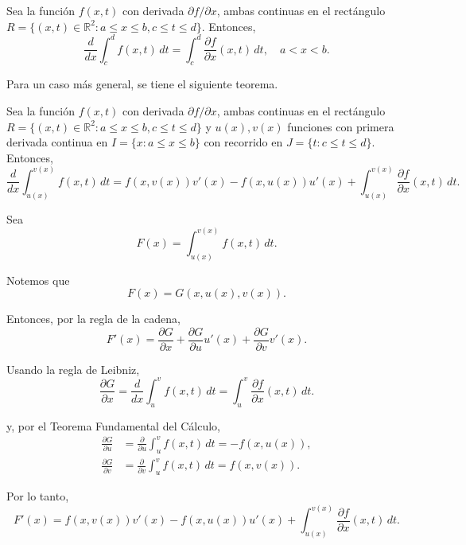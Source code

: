 \begin{teorema}
    Sea la función $f(x,t)$ con derivada $\partial f/\partial x$, ambas continuas en el rectángulo $R = \{(x,t) \in \mathbb{R}^2 : a \leq x \leq b, c \leq t \leq d\}$. Entonces, 
    $$\frac{d}{dx} \int_c^d f(x,t) \,dt = \int_c^d \frac{\partial f}{\partial x}(x,t) \,dt, \quad a < x < b.$$
\end{teorema}

Para un caso más general, se tiene el siguiente teorema.

\begin{teorema}
    Sea la función $f(x,t)$ con derivada $\partial f/\partial x$, ambas continuas en el rectángulo $R = \{(x,t) \in \mathbb{R}^2 : a \leq x \leq b, c \leq t \leq d\}$ y $u(x), v(x)$ funciones con primera derivada continua en $I = \{x : a \leq x\leq b\}$ con recorrido en $J = \{t: c \leq t \leq d\}$. Entonces, 
    $$\frac{d}{dx} \int_{u(x)}^{v(x)} f(x,t) \,dt = f(x,v(x)) v'(x) - f(x,u(x)) u'(x) + \int_{u(x)}^{v(x)} \frac{\partial f}{\partial x}(x,t) \,dt.$$
\end{teorema}

\begin{demo}
    Sea
    $$F(x) =  \int_{u(x)}^{v(x)} f(x,t) \,dt.$$

    Notemos que
    $$F(x) = G(x,u(x),v(x)).$$

    Entonces, por la regla de la cadena,
    $$F'(x) = \frac{\partial G}{\partial x} + \frac{\partial G}{\partial u} u'(x) + \frac{\partial G}{\partial v}v'(x).$$

    Usando la regla de Leibniz, 
    $$\frac{\partial G}{\partial x} = \frac{d}{dx}\int_u^v f(x,t) \,dt = \int_u^v \frac{\partial f}{\partial x}(x,t)\,dt.$$

    y, por el Teorema Fundamental del Cálculo,
    \begin{align*}
      \frac{\partial G}{\partial u} &= \frac{\partial}{\partial u} \int_u^v f(x,t) \,dt = - f(x,u(x)), \\
      \frac{\partial G}{\partial v} &= \frac{\partial}{\partial v} \int_u^v f(x,t) \,dt = f(x,v(x)).
    \end{align*}

    Por lo tanto,
    $$F'(x) = f(x,v(x)) v'(x) - f(x,u(x)) u'(x) + \int_{u(x)}^{v(x)} \frac{\partial f}{\partial x}(x,t) \,dt.$$
\end{demo}


